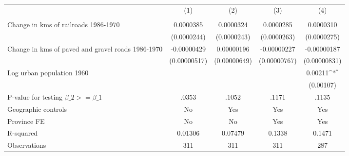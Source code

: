 {
\def\sym#1{\ifmmode^{#1}\else\(^{#1}\)\fi}
\begin{tabular}{l*{4}{c}}
\hline\hline
                &\multicolumn{1}{c}{(1)}&\multicolumn{1}{c}{(2)}&\multicolumn{1}{c}{(3)}&\multicolumn{1}{c}{(4)}\\
                &\multicolumn{1}{c}{}&\multicolumn{1}{c}{}&\multicolumn{1}{c}{}&\multicolumn{1}{c}{}\\
\hline
Change in kms of railroads 1986-1970&0.0000385         &0.0000324         &0.0000285         &0.0000310         \\
                &(0.0000244)         &(0.0000243)         &(0.0000263)         &(0.0000275)         \\
[1em]
Change in kms of paved and gravel roads 1986-1970&-0.00000429         &0.00000196         &-0.00000227         &-0.00000187         \\
                &(0.00000517)         &(0.00000649)         &(0.00000767)         &(0.00000831)         \\
[1em]
Log urban population 1960&                  &                  &                  &  0.00211\sym{*}  \\
                &                  &                  &                  &(0.00107)         \\
\hline
P-value for testing $\beta\_{2} >= \beta\_{1}$&    .0353         &    .1052         &    .1171         &    .1135         \\
Geographic controls&       No         &      Yes         &      Yes         &      Yes         \\
Province FE     &       No         &       No         &      Yes         &      Yes         \\
R-squared       &  0.01306         &  0.07479         &   0.1338         &   0.1471         \\
Observations    &      311         &      311         &      311         &      287         \\
\hline\hline
\end{tabular}
}
